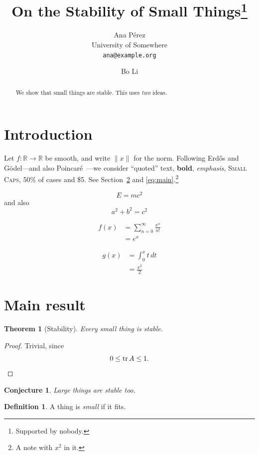 \documentclass[12pt,letterpaper]{amsart}
\title{On the Stability of Small Things\thanks{Supported by nobody.}}
\author{Ana Pérez \\ University of Somewhere \\ \texttt{ana@example.org} \and Bo Li}
\date{}
\newtheorem{thm}{Theorem}[section]
\newtheorem{conj}{Conjecture}
\theoremstyle{definition}
\newtheorem{defn}{Definition}
\newcommand{\R}{\mathbb{R}}
\DeclareMathOperator{\tr}{tr}
\begin{document}
\maketitle

\begin{abstract}
We show that small things are stable. %
This uses \emph{two} ideas.
\end{abstract}

\section{Introduction}\label{sec:intro}
Let $f\colon \R \to \R$ be smooth, and write $\|x\|$ for the norm. Following
Erd\H{o}s and Gödel---and also Poincar\'e~\cite[p.~3]{poincare,godel}---we
consider ``quoted'' text, {\bf bold}, {\em emphasis}, \textsc{Small Caps}, 50\% of
cases and \$5. See Section~\ref{sec:main} and \eqref{eq:main}.\footnote{A note with $x^2$ in it.}

\[ E = mc^2 \]
and also
$$ a^2 + b^2 = c^2 $$

\begin{align}
  f(x) &= \sum_{n=0}^{\infty} \frac{x^n}{n!} \label{eq:main} \\
       &= e^x \nonumber
\end{align}

\begin{equation*}
  \begin{split}
    g(x) &= \int_0^x t\,dt \\
         &= \frac{x^2}{2}
  \end{split}
\end{equation*}

\section{Main result}
\label{sec:main}

\begin{thm}[Stability]\label{thm:stab}
Every small thing is stable.
\end{thm}

\begin{proof}
Trivial, since
\[ 0 \le \tr A \le 1. \qedhere \]
\end{proof}

\begin{conj}
Large things are stable too.
\end{conj}

\begin{defn}
A thing is \emph{small} if it fits.
\end{defn}
\end{document}
